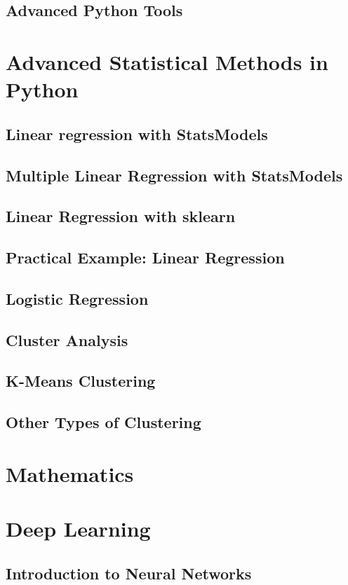 \documentclass[12pt, a4paper]{article}
\begin{document}
\subsection{Advanced Python Tools}
\pagebreak

\section{Advanced Statistical Methods in Python}
\subsection{Linear regression with StatsModels}
\subsection{Multiple Linear Regression with StatsModels}
\subsection{Linear Regression with sklearn}
\subsection{Practical Example: Linear Regression}
\subsection{Logistic Regression}
\subsection{Cluster Analysis}
\subsection{K-Means Clustering}
\subsection{Other Types of Clustering}
\pagebreak

\section{Mathematics}
\pagebreak

\section{Deep Learning}
\subsection{Introduction to Neural Networks}
\end{document}
